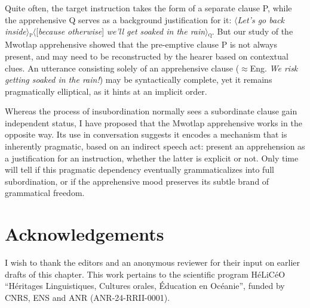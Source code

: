 \documentclass[output=paper,colorlinks,citecolor=brown]{langscibook}
\begin{document}
Quite often, the target instruction takes the form of a separate clause P, while the apprehensive Q serves as a background justification for it: ${\langle}$\textit{Let's go back inside}${\rangle}$\textsc{\textsubscript{p}}${\langle}$[\textit{because otherwise}] \textit{we'll get soaked in the rain}${\rangle}$\textsc{\textsubscript{q}}. But our study of the Mwotlap apprehensive showed that the pre-emptive clause P is not always present, and may need to be reconstructed by the hearer based on contextual clues. An utterance consisting solely of an apprehensive clause (${\approx}$Eng. \textit{We risk getting soaked in the rain!}) may be syntactically complete, yet it remains pragmatically elliptical, as it hints at an implicit order.


Whereas the process of insubordination normally sees a subordinate clause gain independent status, I have proposed that the Mwotlap apprehensive works in the opposite way. Its use in conversation suggests it encodes a mechanism that is inherently pragmatic, based on an indirect speech act: present an apprehension as a justification for an instruction, whether the latter is explicit or not. Only time will tell if this pragmatic dependency eventually grammaticalizes into full subordination, or if the apprehensive mood preserves its subtle brand of grammatical freedom.
 

\section*{Acknowledgements}
I wish to thank the editors and an anonymous reviewer for their input on earlier drafts of this chapter. This work pertains to the scientific program HéLiCéO ``Héritages Linguistiques, Cultures orales, Éducation en Océanie'', funded by CNRS, ENS and ANR (ANR-24-RRII-0001).
\end{document}
